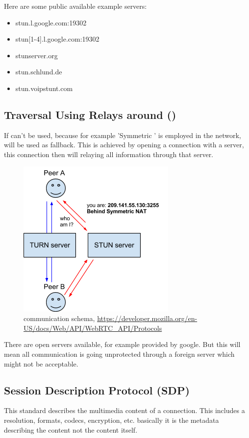 Here are some public available example  servers:
\begin{itemize}
	\item stun.l.google.com:19302
	\item stun[1-4].l.google.com:19302
	\item stunserver.org
	\item stun.schlund.de
	\item stun.voipstunt.com
\end{itemize}

\subsection{Traversal Using Relays around  ()}
If  can't be used, because for example 'Symmetric ' is employed in the network,  will be used as fallback. This is achieved by opening a connection with a  server, this connection then will relaying all information through that server.

\begin{figure}[H]
	\includegraphics[scale=0.5]{images/webrtc-turn.png}
	\centering
	\caption{ communication schema, \url{https://developer.mozilla.org/en-US/docs/Web/API/WebRTC_API/Protocols}}
	\label{fig:TURN}
\end{figure}

There are open  servers available, for example provided by google. But this will mean all communication is going unprotected through a foreign server which might not be acceptable.

\subsection{Session Description Protocol (SDP)}
This standard describes the multimedia content of a connection. This includes a resolution, formats, codecs, encryption, etc. basically it is the metadata describing the content not the content itself.

